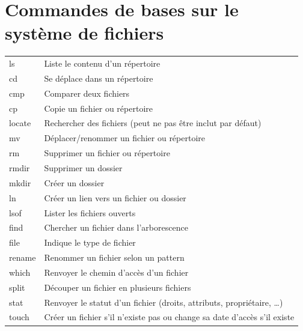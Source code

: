 \documentclass[a4paper, 11pt, french, oneside]{book}
\begin{document}
		\section{Commandes de bases sur le système de fichiers}
			\begin{tabular}{p{3cm}|p{11cm}}
		   		ls & Liste le contenu d’un répertoire\\
				cd	& Se déplace dans un répertoire\\
				cmp	& Comparer deux fichiers\\
				cp	& Copie un fichier ou répertoire\\
				locate & Rechercher des fichiers (peut ne pas être inclut par défaut)\\
				mv	& Déplacer/renommer un fichier ou répertoire\\
				rm	& Supprimer un fichier ou répertoire\\
				rmdir	& Supprimer un dossier\\
				mkdir	& Créer un dossier\\
				ln	& Créer un lien vers un fichier ou dossier\\
				lsof	& Lister les fichiers ouverts\\
				find	& Chercher un fichier dans l’arborescence\\
				file	& Indique le type de fichier\\
				rename	& Renommer un fichier selon un pattern\\
				which	& Renvoyer le chemin d’accès d’un fichier\\
				split	& Découper un fichier en plusieurs fichiers\\
				stat	& Renvoyer le statut d’un fichier (droits, attributs, propriétaire, …)\\
				touch	& Créer un fichier s’il n’existe pas ou change sa date d’accès s’il existe\\
			\end{tabular}
\end{document}
